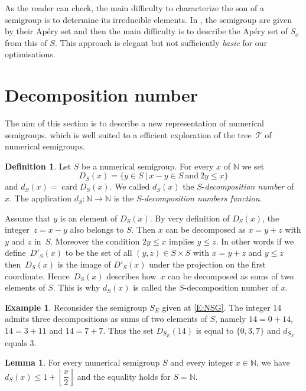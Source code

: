 \documentclass[reqno,11pt]{amsart}
\theoremstyle{plain}
\theoremstyle{definition}
\newtheorem{defi}[prop]{Definition}
\newtheorem{exam}[prop]{Example}
\newtheorem{lem}[prop]{Lemma}
\renewcommand{\leq}{\leqslant}
\newcommand{\NN}{\mathbb{N}}
\DeclareMathOperator{\card}{card}
\begin{document}
As the reader can check, the main difficulty to characterize the son of a semigroup is to determine its irreducible elements.
 In \cite{NumericalSgps}, the semigroup are given by their Ap\'ery set and then the main difficulty is to describe the Ap\'ery set of $S_x$  from this of $S$. 
 This approach is elegant but not sufficiently \emph{basic} for our optimisations.



\section{Decomposition number}
\label{S:DecNumber}

The aim of this section is to describe a new representation of numerical semigroups.
which is well suited to a efficient exploration of the tree~$\mathcal{T}$ of numerical semigroups. 

\begin{defi}
Let $S$ be a numerical semigroup.
For every $x$ of $\NN$  we set
\[
D_S(x)=\{y \in S\ |\ x-y\in S\ \text{and}\ 2y\leq x\}
\]
and $d_S(x)=\card D_S(x)$.
We called $d_S(x)$ the $S$-\emph{decomposition number} of~$x$.
The application $d_S:\NN\to\NN$ is the $S$-\emph{decomposition numbers function}.
\end{defi}

Assume that $y$ is an element of $D_S(x)$.
By very definition of $D_S(x)$, the integer~$z=x-y$ also belongs to $S$. 
Then $x$ can be decomposed as $x=y+z$ with $y$ and $z$ in~$S$. 
Moreover the condition $2y\leq x$ implies $y\leq z$. 
In other words if we define~$D'_S(x)$ to be the set of all $(y,z)\in S\times S$ with $x=y+z$ and $y\leq z$ then~$D_S(x)$ is the image of $D'_S(x)$ under the projection on the first coordinate.
 Hence~$D_S(x)$ describes how~$x$ can be decomposed as sums of two elements of $S$.
 This is why $d_S(x)$ is called the $S$-decomposition number of $x$.

\begin{exam}
Reconsider the semigroup $S_E$ given at \eqref{E:NSG}.
The integer $14$ admits three decompositions as sums of two elements of $S$, namely $14=0+14$, $14=3+11$ and $14=7+7$. 
Thus the set $D_{S_E}(14)$ is equal to $\{0,3,7\}$ and $d_{S_E}$ equals $3$.
\end{exam}


\begin{lem}
\label{L:RepN}
For every numerical semigroup $S$ and every integer $x\in \NN$,  we have $d_S(x)\leq 1+\left\lfloor \dfrac{x}2\right\rfloor$ and the equality holds for $S=\NN$.
\end{lem}
\end{document}
